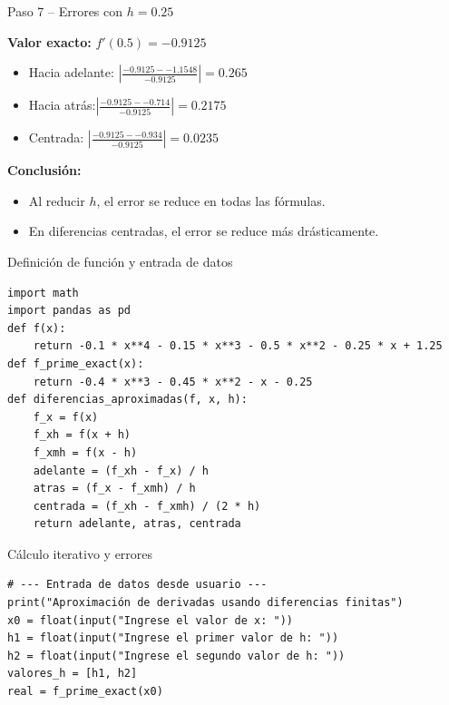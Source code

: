 \documentclass[main.tex]{subfiles}
\begin{document}
\begin{frame}{Paso 7 – Errores con \(h = 0.25\)}

\textbf{Valor exacto:} \( f'(0.5) = -0.9125 \)

\begin{itemize}
  \item Hacia adelante: \(|\frac{-0.9125- -1.1548}{-0.9125}| = 0.265\)
  \item Hacia atrás:\(|\frac{-0.9125- -0.714}{-0.9125}| = 0.2175\)
  \item Centrada: \(|\frac{-0.9125- -0.934}{-0.9125}| = 0.0235\)
\end{itemize}

\textbf{Conclusión:}
\begin{itemize}
  \item Al reducir \(h\), el error se reduce en todas las fórmulas.
  \item En diferencias centradas, el error se reduce más drásticamente.
\end{itemize}

\end{frame}


\begin{frame}[fragile]{Definición de función y entrada de datos}

\begin{lstlisting}[style=mypython]
import math
import pandas as pd
def f(x):
    return -0.1 * x**4 - 0.15 * x**3 - 0.5 * x**2 - 0.25 * x + 1.25
def f_prime_exact(x):
    return -0.4 * x**3 - 0.45 * x**2 - x - 0.25
def diferencias_aproximadas(f, x, h):
    f_x = f(x)
    f_xh = f(x + h)
    f_xmh = f(x - h)
    adelante = (f_xh - f_x) / h
    atras = (f_x - f_xmh) / h
    centrada = (f_xh - f_xmh) / (2 * h)
    return adelante, atras, centrada
\end{lstlisting}
\end{frame}

\begin{frame}[fragile]{Cálculo iterativo y errores}
\begin{lstlisting}[style=mypython]
# --- Entrada de datos desde usuario ---
print("Aproximación de derivadas usando diferencias finitas")
x0 = float(input("Ingrese el valor de x: "))
h1 = float(input("Ingrese el primer valor de h: "))
h2 = float(input("Ingrese el segundo valor de h: "))
valores_h = [h1, h2]
real = f_prime_exact(x0)

  

\end{lstlisting}
\end{frame}
\end{document}
